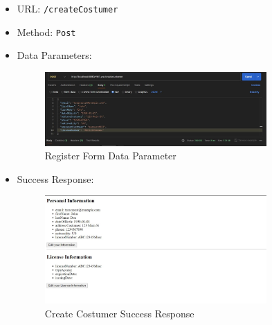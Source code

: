 \begin{itemize}
    \item URL: \texttt{/createCostumer}
    \item Method: \texttt{Post}
    \item Data Parameters: \\
\begin{figure}[h]
\centering
\includegraphics[width=0.8\textwidth, inner]{sections//BLL//DataParameter1.jpg}
\caption{Register Form Data Parameter}
\label{fig:figure1}
\end{figure}
    \item Success Response:
\begin{figure}[h]
\centering
\includegraphics[width=0.8\textwidth, inner]{sections//BLL/SuccssResponse1.jpg}
\caption{Create Costumer Success Response}
\label{fig:figure2}
\end{figure}\newpage

\end{itemize}
